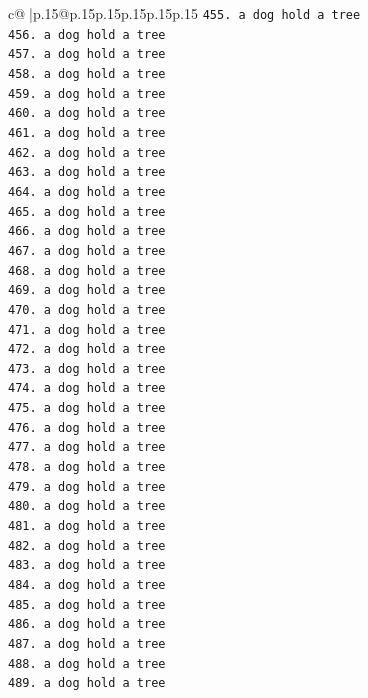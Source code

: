 \documentclass{article}
\begin{document}
{\begin{supertabular}{c@{$\;$}|p{.15\linewidth}@{}p{.15\linewidth}p{.15\linewidth}p{.15\linewidth}p{.15\linewidth}p{.15\linewidth}}
{{{\texttt{455. a dog hold a tree} \\
\texttt{456. a dog hold a tree} \\
\texttt{457. a dog hold a tree} \\
\texttt{458. a dog hold a tree} \\
\texttt{459. a dog hold a tree} \\
\texttt{460. a dog hold a tree} \\
\texttt{461. a dog hold a tree} \\
\texttt{462. a dog hold a tree} \\
\texttt{463. a dog hold a tree} \\
\texttt{464. a dog hold a tree} \\
\texttt{465. a dog hold a tree} \\
\texttt{466. a dog hold a tree} \\
\texttt{467. a dog hold a tree} \\
\texttt{468. a dog hold a tree} \\
\texttt{469. a dog hold a tree} \\
\texttt{470. a dog hold a tree} \\
\texttt{471. a dog hold a tree} \\
\texttt{472. a dog hold a tree} \\
\texttt{473. a dog hold a tree} \\
\texttt{474. a dog hold a tree} \\
\texttt{475. a dog hold a tree} \\
\texttt{476. a dog hold a tree} \\
\texttt{477. a dog hold a tree} \\
\texttt{478. a dog hold a tree} \\
\texttt{479. a dog hold a tree} \\
\texttt{480. a dog hold a tree} \\
\texttt{481. a dog hold a tree} \\
\texttt{482. a dog hold a tree} \\
\texttt{483. a dog hold a tree} \\
\texttt{484. a dog hold a tree} \\
\texttt{485. a dog hold a tree} \\
\texttt{486. a dog hold a tree} \\
\texttt{487. a dog hold a tree} \\
\texttt{488. a dog hold a tree} \\
\texttt{489. a dog hold a tree} \\
}}}
\end{supertabular}}
\end{document}
